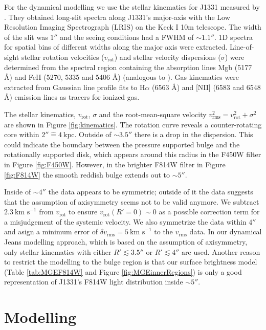\documentclass[useAMS,usenatbib]{mnras}
\begin{document}
For the dynamical modelling we use the stellar kinematics for J1331 measured by \citet{SWELLSV}. They obtained long-slit spectra along J1331's major-axis with the Low Resolution Imaging Spectrograph (LRIS) on the Keck I 10m telescope. The width of the slit was $1''$ and the seeing conditions had a FWHM of $\sim 1.1''$. 1D spectra for spatial bins of different widths along the major axis were extracted. Line-of-sight stellar rotation velocities ($v_\text{rot}$) and stellar velocity dispersions ($\sigma$) were determined from the spectral region containing the absorption lines Mgb (5177 \AA) and FeII (5270, 5335 and 5406 \AA) (analogous to \citealt{SWELLSII}). Gas kinematics were extracted from Gaussian line profile fits to H$\alpha$ (6563 \AA) and [NII] (6583 and 6548 \AA) emission lines as tracers for ionized gas.

The stellar kinematics, $v_\text{rot}$, $\sigma$ and the root-mean-square velocity $v_\text{rms}^2=v_\text{rot}^2 + \sigma^2$ are shown in Figure \ref{fig:kinematics}. The rotation curve reveals a counter-rotating core within $2''\hat{=}4~\text{kpc}$. Outside of $\sim 3.5''$ there is a drop in the dispersion. This could indicate the boundary between the pressure supported bulge and the rotationally supported disk, which appears around this radius in the F450W filter in Figure \ref{fig:F450W}. However, in the brighter F814W filter in Figure \ref{fig:F814W} the smooth reddish bulge extends out to $\sim5''$. 

Inside of $\sim 4''$ the data appears to be symmetric; outside of it the data suggests that the assumption of axisymmetry seems not to be valid anymore. We subtract $2.3~\text{km s}^{-1}$ from $v_\text{rot}$ to ensure $v_\text{rot}(R'=0) \sim 0$ as a possible correction term for a misjudgement of the systemic velocity. We also symmetrize the data within $4''$ and asign a minimum error of $\delta v_\text{rms} = 5~\text{km s}^{-1}$ to the $v_\text{rms}$ data. In our dynamical Jeans modelling approach, which is based on the assumption of axisymmetry, only stellar kinematics with either $R'  \lesssim 3.5''$ or $R' \lesssim 4''$ are used. Another reason to restrict the modelling to the bulge region is that our surface brightness model (Table \ref{tab:MGEF814W} and Figure \ref{fig:MGEinnerRegions}) is only a good representation of J1331's F814W light distribution inside $\sim 5''$.

\section{Modelling} \label{sec:Modelling}
\end{document}
